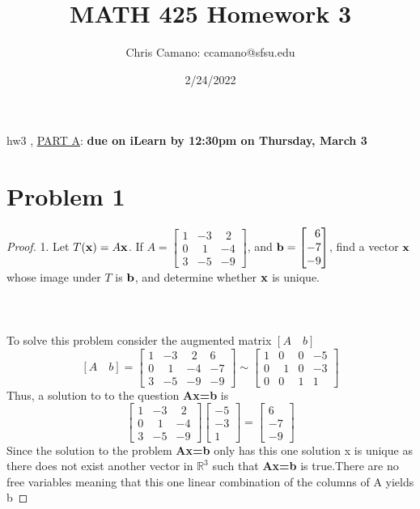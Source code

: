 \documentclass[12pt]{article}
\author{Chris Camano: ccamano@sfsu.edu}
\title{MATH 425 Homework 3 }
\date{2/24/2022}
\newcommand{\tab}{\\\\}
\newcommand{\sect}[1]{\section*{#1}}
\newcommand{\R}{\mathbb{R}}
\newcommand{\Axb}{\textbf{Ax=b} }
\begin{document}
\maketitle
\noindent
hw3 , \underline{PART A}: {\bf due on iLearn by 12:30pm on Thursday, March 3}
\vskip 10pt
\noindent

\sect{Problem 1}
\begin{proof}
  1. Let $T({\bf x}) = A{\bf x}$. If
  $A=\begin{bmatrix}
  1 & -3 & ~~2\\
  0 & ~~1 & -4\\
  3 & -5 & -9
  \end{bmatrix}$, and ${\bf b} = \begin{bmatrix}~~6\\ -7 \\ -9 \end{bmatrix}$, find a vector ${\bf x}$
  whose image under $T$ is ${\bf b}$, and determine whether ${\bf x}$ is unique.\tab\tab
  To solve this problem consider the augmented matrix $ [A \quad b]$
  \[
  [A \quad b]=\begin{bmatrix}
  1 & -3 & ~~2&6\\
  0 & ~~1 & -4&-7\\
  3 & -5 & -9&-9
  \end{bmatrix} \sim
  \begin{bmatrix}
  1 & 0 & 0&-5\\
  0 & ~~1 & 0&-3\\
  0 & 0 & 1&1
  \end{bmatrix}
  \]
  Thus, a solution to to the question \Axb is
  \[
  \begin{bmatrix}
  1 & -3 & ~~2\\
  0 & ~~1 & -4\\
  3 & -5 & -9
  \end{bmatrix}
  \begin{bmatrix}
    -5\\-3\\1
  \end{bmatrix}=
  \begin{bmatrix}
    6\\-7\\-9
  \end{bmatrix}
  \]
  Since the solution to the problem \Axb only has this one solution x is unique as there does not exist another vector in $\R^3$ such that \Axb is true.There are no free variables meaning that this one linear combination of the columns of A yields b
  \noindent
\end{proof}\tab\tab
\end{document}
